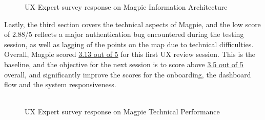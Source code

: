 \begin{figure}
    \centering
    \caption{UX Expert survey response on Magpie Information Architecture}
\end{figure}
\newpage
Lastly, the third section covers the technical aspects of Magpie, and the low score of 2.88/5 reflects a major authentication bug encountered during the testing session, as well as lagging of the points on the map due to technical difficulties.\\
Overall, Magpie scored \underline{3.13 out of 5} for this first UX review session. This is the baseline, and the objective for the next session is to score above \underline{3.5 out of 5} overall, and significantly improve the scores for the onboarding, the dashboard flow and the system responsiveness.\\\\
\begin{figure}
    \centering
    \caption{UX Expert survey response on Magpie Technical Performance}
\end{figure}
